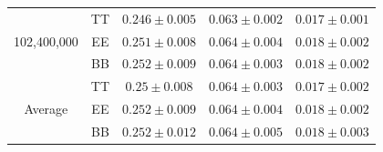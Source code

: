 \documentclass[apj]{emulateapj}
\begin{document}
\begin{table}[tbh]
\begin{center}
\begin{tabular}{c c c c c}
\multirow{3}{*}{102,400,000}  & TT  & $ 0.246 \pm 0.005 $  & $ 0.063 \pm 0.002 $  & $ 0.017 \pm 0.001 $ \\
& EE  & $ 0.251 \pm 0.008 $  & $ 0.064 \pm 0.004 $  & $ 0.018 \pm 0.002 $ \\
& BB  & $ 0.252 \pm 0.009 $  & $ 0.064 \pm 0.003 $  & $ 0.018 \pm 0.002 $ \\
\hline
\multirow{3}{*}{Average}  & TT  & $ 0.25 \pm 0.008 $  & $ 0.064 \pm 0.003 $  & $ 0.017 \pm 0.002 $ \\
 & EE  & $ 0.252 \pm 0.009 $  & $ 0.064 \pm 0.004 $  & $ 0.018 \pm 0.002 $ \\
 & BB  & $ 0.252 \pm 0.012 $  & $ 0.064 \pm 0.005 $  & $ 0.018 \pm 0.003 $ \\
\end{tabular}
 \normalsize
\end{center}
\end{table}
\end{document}
